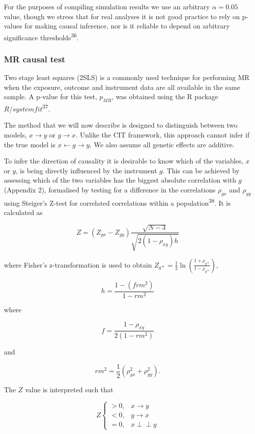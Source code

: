 \documentclass[]{article}
\begin{document}
For the purposes of compiling simulation results we use an arbitrary
\(\alpha = 0.05\) value, though we stress that for real analyses it is
not good practice to rely on p-values for making causal inference, nor
is it reliable to depend on arbitrary significance
thresholds\textsuperscript{36}.

\subsubsection{MR causal test}\label{mr-causal-test}

Two stage least squares (2SLS) is a commonly used technique for
performing MR when the exposure, outcome and instrument data are all
available in the same sample. A p-value for this test, \(p_{MR}\), was
obtained using the R package \(R/systemfit\)\textsuperscript{37}.

The method that we will now describe is designed to distinguish between
two models, \(x \rightarrow y\) or \(y \rightarrow x\). Unlike the CIT
framework, this approach cannot infer if the true model is
\(x \leftarrow g \rightarrow y\). We also assume all genetic effects are
additive.

To infer the direction of causality it is desirable to know which of the
variables, \(x\) or \(y\), is being directly influenced by the
instrument \(g\). This can be achieved by assessing which of the two
variables has the biggest absolute correlation with \(g\) (Appendix 2),
formalised by testing for a difference in the correlations \(\rho_{gx}\)
and \(\rho_{gy}\) using Steiger's Z-test for correlated correlations
within a population\textsuperscript{38}. It is calculated as

\[
Z = (Z_{gx} - Z_{gy}) \frac{\sqrt{N-3}}{\sqrt{2(1-\rho_{xy})h}}
\]

where Fisher's z-transformation is used to obtain
\(Z_{g*} = \frac{1}{2} \ln \left ( \frac{1+\rho_{g*}}{1-\rho_{g*}} \right )\),

\[
h = \frac{1 - (frm^2)} {1 - rm^2}
\]

where

\[
f = \frac{1 - \rho_{xy}}{2(1 - rm^2)}
\]

and

\[
rm^2 = \frac{1}{2}(\rho_{gx}^2 + \rho_{gy}^2).
\]

The \(Z\) value is interpreted such that

\[
Z \left\{
\begin{array}{ll}
> 0, & x \to y\\
< 0, & y \to x\\
= 0, & x \perp\!\!\!\perp y 
\end{array} \right.
\]
\end{document}

